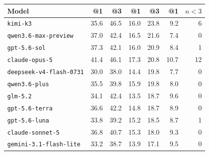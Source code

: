 \begin{tabular}{lrrrrrr}
\toprule
Model & \pass{}@1 & \pass{}@3 & \usable{}@1 & \usable{}@3 & \vuln{}@1 & $n{<}3$ \\
\midrule
\texttt{kimi-k3} & 35.6 & 46.5 & 16.0 & 23.8 & 9.2 & 6 \\
\texttt{qwen3.6-max-preview} & 37.0 & 42.4 & 16.5 & 21.6 & 7.4 & 0 \\
\texttt{gpt-5.6-sol} & 37.3 & 42.1 & 16.0 & 20.9 & 8.4 & 1 \\
\texttt{claude-opus-5} & 41.4 & 46.1 & 17.3 & 20.8 & 10.7 & 12 \\
\texttt{deepseek-v4-flash-0731} & 30.0 & 38.0 & 14.4 & 19.8 & 7.7 & 0 \\
\texttt{qwen3.6-plus} & 35.5 & 39.8 & 15.9 & 19.8 & 8.0 & 0 \\
\texttt{glm-5.2} & 34.1 & 42.4 & 13.5 & 18.7 & 9.6 & 0 \\
\texttt{gpt-5.6-terra} & 36.6 & 42.2 & 14.8 & 18.7 & 8.9 & 0 \\
\texttt{gpt-5.6-luna} & 33.8 & 39.2 & 15.2 & 18.5 & 8.7 & 1 \\
\texttt{claude-sonnet-5} & 36.8 & 40.7 & 15.3 & 18.0 & 9.3 & 0 \\
\texttt{gemini-3.1-flash-lite} & 33.2 & 38.7 & 13.9 & 17.1 & 9.5 & 0 \\
\bottomrule
\end{tabular}
